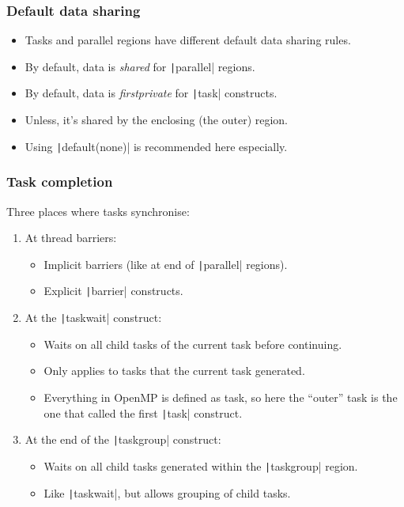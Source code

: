\documentclass{beamer}
\begin{document}
\begin{frame}
\frametitle{Default data sharing}
\begin{itemize}
  \item Tasks and parallel regions have different default data sharing rules.
  \item By default, data is \emph{shared} for \texttt|parallel| regions.
  \item By default, data is \emph{firstprivate} for \texttt|task| constructs.
  \item Unless, it's shared by the enclosing (the outer) region.
  \item Using \texttt|default(none)| is recommended here especially.
\end{itemize}
\end{frame}

\begin{frame}
\frametitle{Task completion}
Three places where tasks synchronise:
\begin{enumerate}
  \item At thread barriers:
    \begin{itemize}
      \item Implicit barriers (like at end of \texttt|parallel| regions).
      \item Explicit \texttt|barrier| constructs.
    \end{itemize}
  \item At the \texttt|taskwait| construct:
    \begin{itemize}
      \item Waits on all child tasks of the current task before continuing.
      \item Only applies to tasks that the current task generated.
      \item Everything in OpenMP is defined as task, so here the ``outer'' task is the one that called the first \texttt|task| construct.
    \end{itemize}
  \item At the end of the \texttt|taskgroup| construct:
    \begin{itemize}
      \item Waits on all child tasks generated within the \texttt|taskgroup| region.
      \item Like \texttt|taskwait|, but allows grouping of child tasks.
    \end{itemize}
\end{enumerate}
\end{frame}
\end{document}
